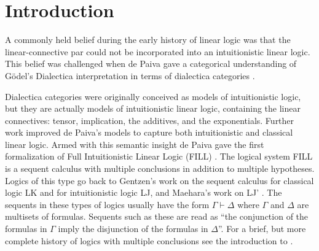 \documentclass[preprint,12pt]{elsarticle}
\begin{document}
\section{Introduction}
\label{sec:introduction}

A commonly held belief during the early history of linear logic was
that the linear-connective par could not be incorporated into an
intuitionistic linear logic.  This belief was challenged when de Paiva
gave a categorical understanding of G\"odel's Dialectica
interpretation in terms of dialectica categories
\cite{dePaiva:1987,dePaiva:1988}.  

Dialectica categories were originally conceived  as models of
intuitionistic logic, but they are actually models of intuitionistic
linear logic, containing the linear connectives: tensor, implication,
the additives, and the exponentials.  Further work improved de Paiva's
models to capture both intuitionistic and classical linear logic.
Armed with this semantic insight de Paiva gave the first formalization
of Full Intuitionistic Linear Logic (FILL) \cite{dePaiva:1988}. The logical system FILL
is a sequent calculus with multiple conclusions in addition to
multiple hypotheses.  Logics of this type go back to Gentzen's work on
the sequent calculus for classical logic LK and for intuitionistic
logic LJ, and Maehara's work on LJ' \cite{Maehara:1954,Takeuti:1975}.
The sequents in these types of logics usually have the form $\Gamma\vdash \Delta$ where $\Gamma$ and $\Delta$ are multisets of formulas.
Sequents such as these are read as ``the conjunction of the formulas
in $\Gamma$ imply the disjunction of the formulas in $\Delta$''.  For
a brief, but more complete history of logics with multiple conclusions
see the introduction to \cite{dePaiva:2005}.
\end{document}
